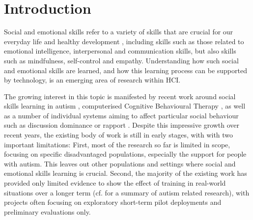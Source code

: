 \documentclass[prodmode,acmtochi]{acmsmall}
\newcommand{\todo}[1]{\textrm{\textrm{\textcolor{LightBlue}{[[#1]]}}}}
\newcommand{\GeraldineFIX}[1]{}
\begin{document}
   



\section{Introduction}

Social and emotional skills refer to a variety of skills that are crucial for our everyday life and healthy development \cite{Weare2011,Adi2007a,Damon2006}, including skills such as those related to emotional intelligence, interpersonal and communication skills, but also skills such as mindfulness, self-control and empathy.
%
Understanding how such social and emotional skills are learned, and how this learning process can be supported by technology, is an emerging area of research within HCI. 

The growing interest in this topic is manifested by recent work around social skills learning in autism \cite{Kientz2013}, computerised Cognitive Behavioural Therapy \cite{Coyle2007}, as well as a number of individual systems aiming to affect particular social behaviour such as discussion dominance or rapport \cite{Balaam2011,Kim2008}. Despite this impressive growth over recent years, the existing body of work is still in early stages, with  with two important limitations: 
	First, most of the research so far is limited in scope, focusing on specific disadvantaged populations, especially the support for people with autism. This leaves out other populations and settings where social and emotional skills learning is crucial. 
	Second, the majority of the existing work has provided only limited evidence to show the effect of training in real-world situations over a longer term (cf. \cite[p. 108-109]{Kientz2013} for a summary of autism related research), with projects often focusing on exploratory short-term pilot deployments and preliminary evaluations only. 
\end{document}
